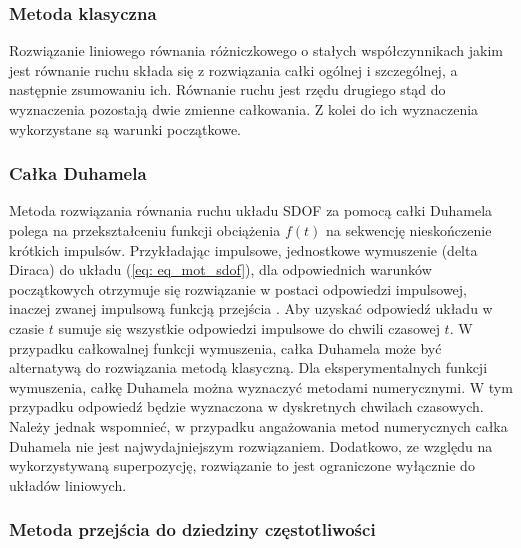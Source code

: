 \subsubsection{Metoda klasyczna}

Rozwiązanie liniowego równania różniczkowego o stałych współczynnikach jakim jest równanie ruchu składa się z rozwiązania całki ogólnej i szczególnej, a następnie zsumowaniu ich. Równanie ruchu jest rzędu drugiego stąd do wyznaczenia pozostają dwie zmienne całkowania. Z kolei do ich wyznaczenia wykorzystane są warunki początkowe.

\subsubsection{Całka Duhamela}

Metoda rozwiązania równania ruchu układu SDOF za pomocą całki Duhamela polega na przekształceniu funkcji obciążenia $f(t)$ na sekwencję nieskończenie krótkich impulsów. Przykładając impulsowe, jednostkowe wymuszenie (delta Diraca) do układu (\ref{eq: eq_mot_sdof}), dla odpowiednich warunków początkowych otrzymuje się rozwiązanie w postaci odpowiedzi impulsowej, inaczej zwanej impulsową funkcją przejścia . Aby uzyskać odpowiedź układu w czasie $t$ sumuje się wszystkie odpowiedzi impulsowe do chwili czasowej $t$. W przypadku całkowalnej funkcji wymuszenia, całka Duhamela może być alternatywą do rozwiązania metodą klasyczną. Dla eksperymentalnych funkcji wymuszenia, całkę Duhamela można wyznaczyć metodami numerycznymi. W tym przypadku odpowiedź będzie wyznaczona w dyskretnych chwilach czasowych. Należy jednak wspomnieć, w przypadku angażowania metod numerycznych całka Duhamela nie jest najwydajniejszym rozwiązaniem. Dodatkowo, ze względu na wykorzystywaną superpozycję, rozwiązanie to jest ograniczone wyłącznie do układów liniowych.

\subsubsection{Metoda przejścia do dziedziny częstotliwości}

